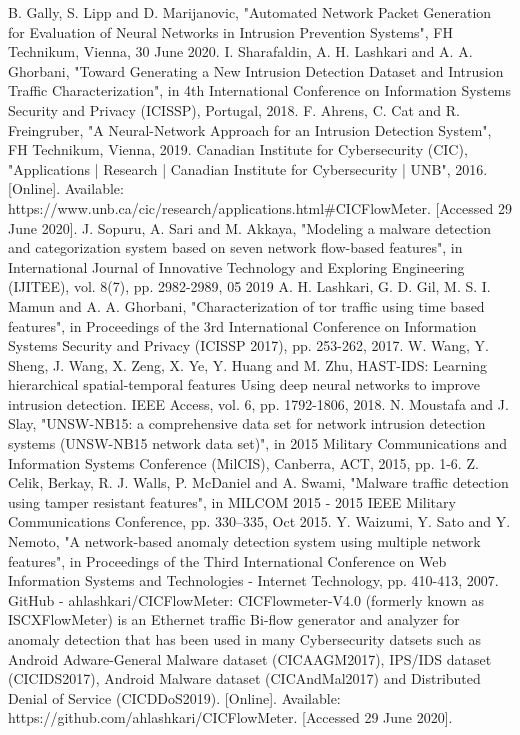 \documentclass[conference]{IEEEtran}
\begin{document}
\begin{thebibliography}{00}
 B. Gally, S. Lipp and D. Marijanovic, "Automated Network Packet Generation for Evaluation of Neural Networks in Intrusion Prevention Systems", FH Technikum, Vienna, 30 June 2020.
 I. Sharafaldin, A. H. Lashkari and A. A. Ghorbani, "Toward Generating a New Intrusion Detection Dataset and Intrusion Traffic Characterization", in 4th International Conference on Information Systems Security and Privacy (ICISSP), Portugal, 2018.
 F. Ahrens, C. Cat and R. Freingruber, "A Neural-Network Approach for an Intrusion Detection System", FH Technikum, Vienna, 2019.
 Canadian Institute for Cybersecurity (CIC), "Applications | Research | Canadian Institute for Cybersecurity | UNB", 2016. [Online]. Available: https://www.unb.ca/cic/research/applications.html\#CICFlowMeter. [Accessed 29 June 2020].
 J. Sopuru, A. Sari and M. Akkaya, "Modeling a malware detection and categorization system based on seven network flow-based features", in International Journal of Innovative Technology and Exploring Engineering (IJITEE), vol. 8(7), pp. 2982-2989, 05 2019
 A. H. Lashkari, G. D. Gil, M. S. I. Mamun and A. A. Ghorbani, "Characterization of tor traffic using time based features", in Proceedings of the 3rd International Conference on Information Systems Security and Privacy (ICISSP 2017), pp. 253-262, 2017.
 W. Wang, Y. Sheng, J. Wang, X. Zeng, X. Ye, Y. Huang and M. Zhu, HAST-IDS: Learning hierarchical spatial-temporal features Using deep neural networks to improve intrusion detection. IEEE Access, vol. 6, pp. 1792-1806, 2018.
 N. Moustafa and J. Slay, "UNSW-NB15: a comprehensive data set for network intrusion detection systems (UNSW-NB15 network data set)", in 2015 Military Communications and Information Systems Conference (MilCIS), Canberra, ACT, 2015, pp. 1-6.
 Z. Celik, Berkay, R. J. Walls, P. McDaniel and A. Swami, "Malware traffic detection using tamper resistant features", in MILCOM 2015 - 2015 IEEE Military Communications Conference, pp. 330–335, Oct 2015.
 Y. Waizumi, Y. Sato and Y. Nemoto, "A network-based anomaly detection system using multiple network features", in Proceedings of the Third International Conference on Web Information Systems and Technologies - Internet Technology, pp. 410-413, 2007.
 GitHub - ahlashkari/CICFlowMeter: CICFlowmeter-V4.0 (formerly known as ISCXFlowMeter) is an Ethernet traffic Bi-flow generator and analyzer for anomaly detection that has been used in many Cybersecurity datsets such as Android Adware-General Malware dataset (CICAAGM2017), IPS/IDS dataset (CICIDS2017), Android Malware dataset (CICAndMal2017) and Distributed Denial of Service (CICDDoS2019). [Online]. Available: https://github.com/ahlashkari/CICFlowMeter. [Accessed 29 June 2020].

\end{thebibliography}
\end{document}
